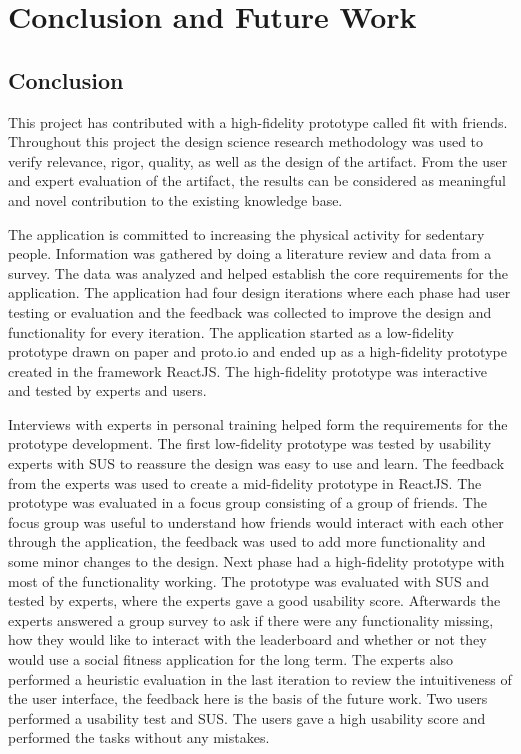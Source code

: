 \chapter{Conclusion and Future Work}
\section{Conclusion}
This project has contributed with a high-fidelity prototype called fit with friends. Throughout this project the design science research methodology was used to verify relevance, rigor, quality, as well as the design of the artifact. From the user and expert evaluation of the artifact, the results can be considered as meaningful and novel contribution to the existing knowledge base.

The application is committed to increasing the physical activity for sedentary people. Information was gathered by doing a literature review and data from a survey. The data was analyzed and helped establish the core requirements for the application. The application had four design iterations where each phase had user testing or evaluation and the feedback was collected to improve the design and functionality for every iteration.  The application started as a low-fidelity prototype drawn on paper and proto.io and ended up as a high-fidelity prototype created in the framework ReactJS. The high-fidelity prototype was interactive and tested by experts and users.

Interviews with experts in personal training helped form the requirements for the prototype development. The first low-fidelity prototype was tested by usability experts with SUS to reassure the design was easy to use and learn. The feedback from the experts was used to create a mid-fidelity prototype in ReactJS. The prototype was evaluated in a focus group consisting of a group of friends. The focus group was useful to understand how friends would interact with each other through the application, the feedback was used to add more functionality and some minor changes to the design. Next phase had a high-fidelity prototype with most of the functionality working. The prototype was evaluated with SUS and tested by experts, where the experts gave a good usability score. Afterwards the experts answered a group survey to ask if there were any functionality missing, how they would like to interact with the leaderboard and whether or not they would use a social fitness application for the long term. The experts also performed a heuristic evaluation in the last iteration to review the intuitiveness of the user interface, the feedback here is the basis of the future work.
Two users performed a usability test and SUS. The users gave a high usability score and performed the tasks without any mistakes. 

